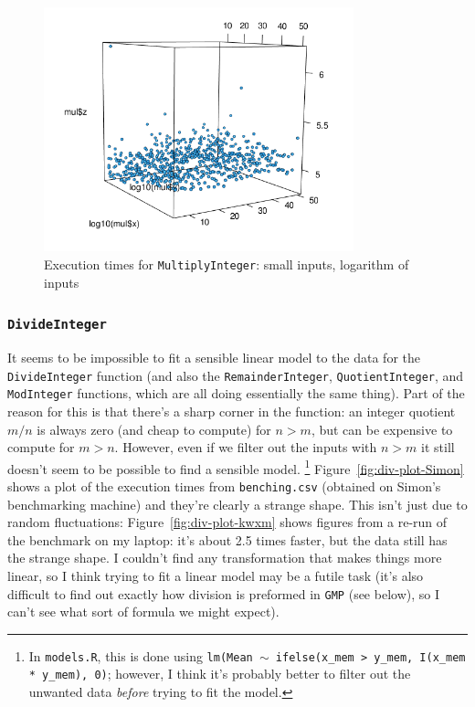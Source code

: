\documentclass[a4paper]{article}
\begin{document}
\begin{figure}[!ht]
\centering
  \includegraphics[width=0.8\textwidth]{figures/mul-small-2.png}
  \caption{Execution times for \texttt{MultiplyInteger}: small inputs, logarithm of inputs}
  \label{fig:mul-plot-small-2}
\end{figure}

\subsubsection*{\texttt{DivideInteger}}
It seems to be impossible to fit a sensible linear model to the data
for the \verb|DivideInteger| function (and also the
\verb|RemainderInteger|, \verb|QuotientInteger|, and \verb|ModInteger|
functions, which are all doing essentially the same thing).  Part of
the reason for this is that there's a sharp corner in the function: an
integer quotient $m/n$ is always zero (and cheap to compute) for
$n>m$, but can be expensive to compute for $m>n$.  However, even if we
filter out the inputs with $n>m$ it still doesn't seem to be possible
to find a sensible model.%
\footnote{In \texttt{models.R}, this is done using \texttt{lm(Mean
    $\sim$ ifelse(x\_mem > y\_mem, I(x\_mem * y\_mem), 0)}; however, I
  think it's probably better to filter out the unwanted data
  \textit{before} trying to fit the model.}
Figure~\ref{fig:div-plot-Simon} shows a plot of the execution times
from \verb|benching.csv| (obtained on Simon's benchmarking machine)
and they're clearly a strange shape.  This isn't just due to random
fluctuations: Figure~\ref{fig:div-plot-kwxm} shows figures from a
re-run of the benchmark on my laptop: it's about 2.5 times faster, but
the data still has the strange shape.  I couldn't find any
transformation that makes things more linear, so I think trying to fit
a linear model may be a futile task (it's also difficult to find out
exactly how division is preformed in \texttt{GMP} (see below), so I can't see
what sort of formula we might expect).
\end{document}
